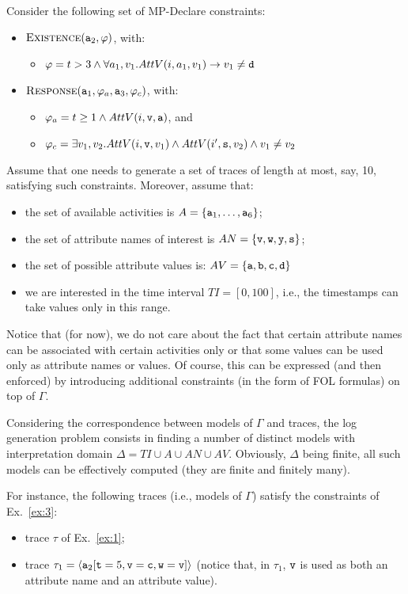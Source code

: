 \begin{example}\label{ex:3}
Consider the following set of MP-Declare constraints:
\begin{itemize}
 \item $\textsc{Existence}(\mathtt{a}_2,\varphi)$, with:
	\begin{itemize}
		\item $\varphi=t>3\land \forall a_1,v_1.
			AttV(i,a_1,v_1)\rightarrow
				v_1\neq \mathtt{d}$
	\end{itemize}
		\item $\textsc{Response}(\mathtt{a}_1,\varphi_a,\mathtt{a}_3,\varphi_c)$, with:
	\begin{itemize}
		\item $\varphi_a=t\geq 1\land AttV(i,\mathtt{v},\mathtt{a})$, and
		\item $\varphi_c=
		\exists v_1,v_2.
			AttV(i,\mathtt{v},v_1)\land AttV(i',\mathtt{s},v_2)\land
				v_1\neq v_2$
	\end{itemize}
\end{itemize}
Assume
that one needs to generate a set of traces of length at most, say, 10,
satisfying such constraints. Moreover, assume that:
\begin{itemize}
 \item the set of available activities is
	$A=\{\mathtt{a}_1, \ldots,\mathtt{a}_6\}$;
 \item the set of attribute names of interest is
	$AN=\{\mathtt{v},\mathtt{w}, \mathtt{y},\mathtt{s}\}$;
 \item the set of possible attribute values is:
	$AV=\{\mathtt{a},\mathtt{b},\mathtt{c},\mathtt{d}\}$
 \item we are interested in the time interval $TI=[0,100]$, i.e., the timestamps
 can take values only in this range.
\end{itemize}
Notice that (for now), we do not care about the fact that certain attribute names
can be associated with certain activities only or that some values
can be used only as attribute names or values.
Of course, this can be expressed (and then enforced) by introducing
additional constraints (in the form of FOL formulas) on top of
$\Gamma$.

Considering the correspondence between models of $\Gamma$ and traces, the log generation problem consists in finding a number of distinct
models with interpretation domain $\Delta=TI\cup A\cup AN\cup AV$.
Obviously, $\Delta$ being finite, all such models can be effectively
computed (they are finite and finitely many).

For instance, the following traces (i.e., models of $\Gamma$)
satisfy the constraints of Ex.~\ref{ex:3}:

\begin{itemize}
 \item trace $\tau$ of Ex.~\ref{ex:1};
 \item trace $\tau_1=\langle\mathtt{a}_2[
	\mathtt{t}=5,
	\mathtt{v}=\mathtt{c},
	\mathtt{w}=\mathtt{v}]\rangle$ (notice that, in $\tau_1$, $\mathtt{v}$ is used as both
	an attribute name and an attribute value).
\end{itemize}



\end{example}

